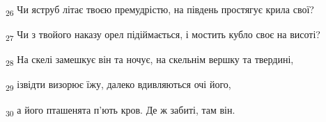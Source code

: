 \begin{tcolorbox}
\textsubscript{26} Чи яструб літає твоєю премудрістю, на південь простягує крила свої?
\end{tcolorbox}
\begin{tcolorbox}
\textsubscript{27} Чи з твойого наказу орел підіймається, і мостить кубло своє на висоті?
\end{tcolorbox}
\begin{tcolorbox}
\textsubscript{28} На скелі замешкує він та ночує, на скельнім вершку та твердині,
\end{tcolorbox}
\begin{tcolorbox}
\textsubscript{29} ізвідти визорює їжу, далеко вдивляються очі його,
\end{tcolorbox}
\begin{tcolorbox}
\textsubscript{30} а його пташенята п'ють кров. Де ж забиті, там він.
\end{tcolorbox}
